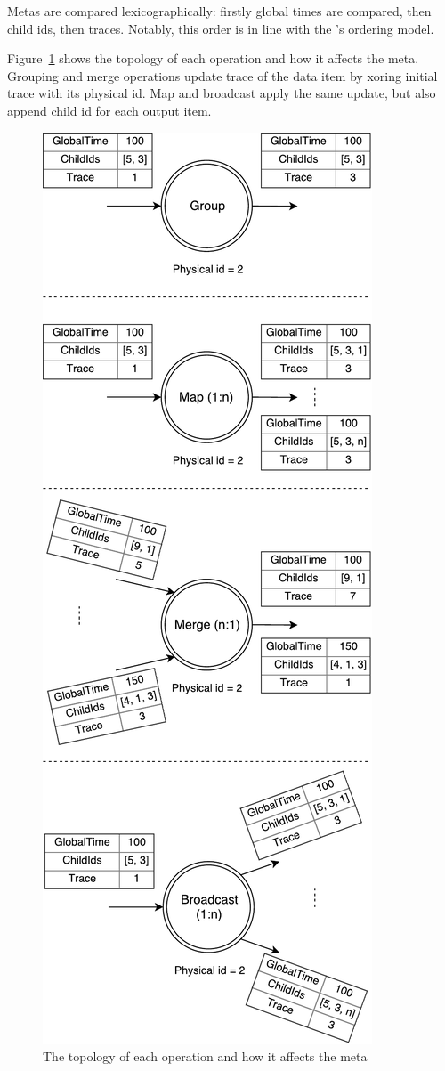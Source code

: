 
Metas are compared lexicographically: firstly global times are compared, then child ids, then traces. Notably, this order is in line with the \FlameStream's ordering model.

Figure~\ref{logical-graph-ops-figure} shows the topology of each operation and how it affects the meta. Grouping and merge operations update trace of the data item by xoring initial trace with its physical id. Map and broadcast apply the same update, but also append child id for each output item.

\begin{figure}[htbp]
  \centering
  \includegraphics[scale=0.5]{pics/operations}
  \caption{The topology of each operation and how it affects the meta}
  \label {logical-graph-ops-figure}
\end{figure}

